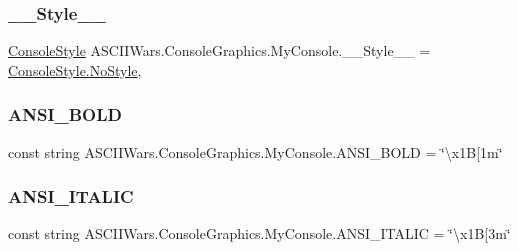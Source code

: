 \subsubsection{\texorpdfstring{\+\_\+\+\_\+\+Style\+\_\+\+\_\+}{\_\_Style\_\_}}
{\footnotesize\ttfamily \hyperlink{namespace_a_s_c_i_i_wars_1_1_console_graphics_a9b323f4b2bf48062c9245b24e74b2882}{Console\+Style} A\+S\+C\+I\+I\+Wars.\+Console\+Graphics.\+My\+Console.\+\_\+\+\_\+\+Style\+\_\+\+\_\+ = \hyperlink{namespace_a_s_c_i_i_wars_1_1_console_graphics_a9b323f4b2bf48062c9245b24e74b2882aaf0ab25243139e9c44bdbfbde2ce6f1d}{Console\+Style.\+No\+Style}\hspace{0.3cm}{\ttfamily [static]}, {\ttfamily [private]}}

\hypertarget{class_a_s_c_i_i_wars_1_1_console_graphics_1_1_my_console_ac0edfa66a89ea22bdc8315c357665fba}{}\label{class_a_s_c_i_i_wars_1_1_console_graphics_1_1_my_console_ac0edfa66a89ea22bdc8315c357665fba} 
\subsubsection{\texorpdfstring{A\+N\+S\+I\+\_\+\+B\+O\+LD}{ANSI\_BOLD}}
{\footnotesize\ttfamily const string A\+S\+C\+I\+I\+Wars.\+Console\+Graphics.\+My\+Console.\+A\+N\+S\+I\+\_\+\+B\+O\+LD = \char`\"{}\textbackslash{}x1B\mbox{[}1m\char`\"{}}

\hypertarget{class_a_s_c_i_i_wars_1_1_console_graphics_1_1_my_console_a78301f49f068fdc8f836db81945b29e5}{}\label{class_a_s_c_i_i_wars_1_1_console_graphics_1_1_my_console_a78301f49f068fdc8f836db81945b29e5} 
\subsubsection{\texorpdfstring{A\+N\+S\+I\+\_\+\+I\+T\+A\+L\+IC}{ANSI\_ITALIC}}
{\footnotesize\ttfamily const string A\+S\+C\+I\+I\+Wars.\+Console\+Graphics.\+My\+Console.\+A\+N\+S\+I\+\_\+\+I\+T\+A\+L\+IC = \char`\"{}\textbackslash{}x1B\mbox{[}3m\char`\"{}}

